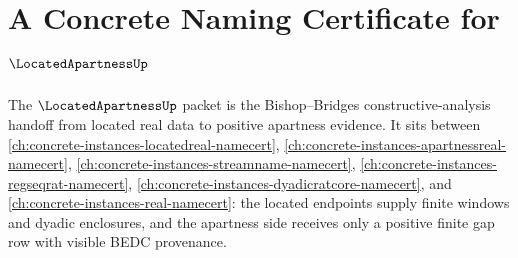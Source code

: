 \chapter{A Concrete Naming Certificate for $\LocatedApartnessUp$}
\label{ch:concrete-instances-located-apartness-namecert}

The $\LocatedApartnessUp$ packet is the Bishop--Bridges constructive-analysis
handoff from located real data to positive apartness evidence. It sits between
\autoref{ch:concrete-instances-locatedreal-namecert},
\autoref{ch:concrete-instances-apartnessreal-namecert},
\autoref{ch:concrete-instances-streamname-namecert},
\autoref{ch:concrete-instances-regseqrat-namecert},
\autoref{ch:concrete-instances-dyadicratcore-namecert}, and
\autoref{ch:concrete-instances-real-namecert}: the located endpoints supply
finite windows and dyadic enclosures, and the apartness side receives only a
positive finite gap row with visible BEDC provenance.

